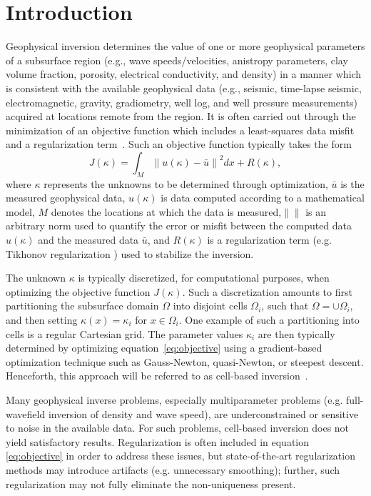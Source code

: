 \documentclass[manuscript,revised]{geophysics}
\newcommand\norm[1]{\left\lVert#1\right\rVert}
\begin{document}
\section{Introduction}
Geophysical inversion determines the value of one or more geophysical parameters of a subsurface region (e.g., wave speeds/velocities, anistropy parameters, clay volume fraction, porosity, electrical conductivity, and density) in a manner which is consistent with the available geophysical data (e.g., seismic, time-lapse seismic, electromagnetic, gravity, gradiometry, well log, and well pressure measurements)  acquired at locations remote from the region.  It is often carried out through the minimization of an objective function which includes a least-squares data misfit and a regularization term~\cite{Parker_1994}. Such an objective function typically takes the form
\begin{equation} \label{eq:objective}
J\left(\kappa\right) = \int_M \norm{u(\kappa)-\bar{u}}^2  dx + R\left(\kappa\right),
\end{equation}
where $\kappa$ represents the unknowns to be determined through optimization, $\bar{u}$ is the measured geophysical data, $u(\kappa)$ is data computed according to a mathematical model, $M$ denotes the locations at which the data is measured,$\norm{}$ is an arbitrary norm used to quantify the error or misfit between the computed data $u(\kappa)$ and the measured data $\bar{u}$, and $R\left(\kappa\right)$ is a regularization term (e.g. Tikhonov regularization ) used to stabilize the inversion. 

The unknown $\kappa$ is typically discretized, for computational purposes, when optimizing the objective function $J\left(\kappa\right)$. Such a discretization amounts to first partitioning the subsurface domain $\Omega$ into disjoint cells $\Omega_i$, such that $\Omega = \cup\Omega_i$, and then setting $\kappa(x)=\kappa_i$ for $x \in \Omega_i$.  One example of such a partitioning into cells is a regular Cartesian grid. The parameter values ${\kappa_i}$ are then typically determined by optimizing equation~\ref{eq:objective} using a gradient-based optimization technique such as Gauss-Newton, quasi-Newton, or steepest descent. Henceforth, this approach will be referred to as cell-based inversion~\cite{Aster_2013}.

Many geophysical inverse problems, especially multiparameter problems (e.g. full-wavefield inversion of density and wave speed), are underconstrained or sensitive to noise in the available data.  For such problems, cell-based inversion does not yield satisfactory results.  Regularization is often included in equation \ref{eq:objective} in order to address these issues, but state-of-the-art regularization methods may introduce artifacts (e.g. unnecessary smoothing); further, such regularization may not fully eliminate the non-uniqueness present.  
\end{document}
